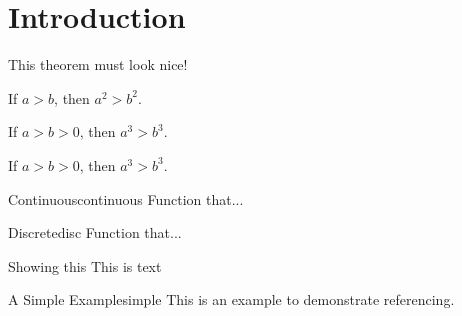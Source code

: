\newpage
\chapter{Introduction}
\label{Introduction}

\begin{theorem}
	This theorem must look nice!
\end{theorem}
\begin{theorem}
If \(a > b\), then \(a^2 > b^2\).
\end{theorem}

\begin{corollary}
If \(a > b > 0\), then \(a^3 > b^3\).
\end{corollary}

\begin{proposition}
If \(a > b > 0\), then \(a^3 > b^3\).
\end{proposition}

\begin{definition}{Continuous}{continuous}
	{Function that...}
\end{definition}

\begin{definition}{Discrete}{disc}
	{Function that...}
\end{definition}


\begin{example}{Showing this}{}
	This is text
\end{example}


\begin{example}{A Simple Example}{simple}
This is an example to demonstrate referencing.
	\hfill
\end{example}
